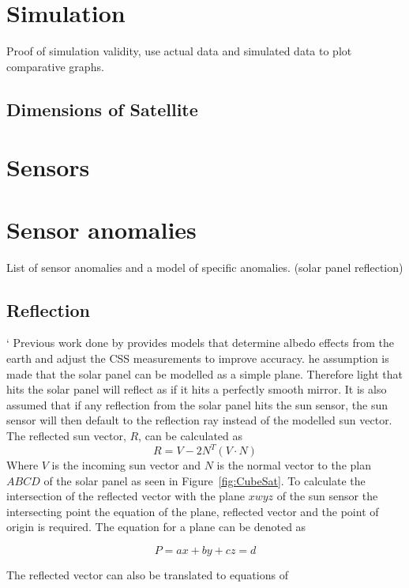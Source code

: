 \documentclass[letterpaper, 10 pt, conference]{ieeeconf}  %
\begin{document}
\section{Simulation}
Proof of simulation validity, use actual data and simulated data to plot comparative graphs. 

\subsection{Dimensions of Satellite}

\section{Sensors}

\section{Sensor anomalies}
List of sensor anomalies and a model of specific anomalies. (solar panel reflection)

\subsection{Reflection}`
Previous work done by \textcite{Cilden-Guler2021} provides models that determine albedo effects from the earth and adjust the CSS measurements to improve accuracy.
he assumption is made that the solar panel can be modelled as a simple plane. Therefore light that hits the solar panel will reflect as if it hits a perfectly smooth mirror. It is also assumed that if any reflection from the solar panel hits the sun sensor, the sun sensor will then default to the reflection ray instead of the modelled sun vector. The reflected sun vector, $R$, can be calculated as
\begin{equation}
	R = V - 2N^T(V \cdot N)
\end{equation}
Where $V$ is the incoming sun vector and $N$ is the normal vector to the plan $ABCD$ of the solar panel as seen in Figure~\ref{fig:CubeSat}. To calculate the intersection of the reflected vector with the plane $xwyz$ of the sun sensor the intersecting point the equation of the plane, reflected vector and the point of origin is required. The equation for a plane can be denoted as 

\begin{equation}
	P = ax + by + cz = d
	\label{eq:Plane}
\end{equation}

The reflected vector can also be translated to equations of 
\end{document}
